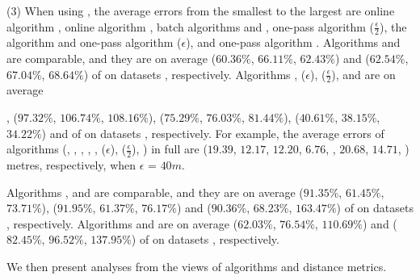 \sstab (3) When using \sed, the average errors from the smallest
to the largest are online algorithm {\dagots}, online algorithm \squishe, batch algorithms \tpa and \dpa,
one-pass algorithm \cised($\frac{\epsilon}{2}$),  the \opt algorithm and one-pass algorithm \cised(${\epsilon}$), and one-pass algorithm .
%
Algorithms \tpa and \dpa are comparable, and they are on average
{($60.36\%$, $66.11\%$, $62.43\%$) and ($62.54\%$, $67.04\%$, $68.64\%$)} of \opt on datasets \dSets, respectively.
Algorithms , \cised(${\epsilon}$), \cised($\frac{\epsilon}{2}$), \squishe and {\dagots} are on average {, ($97.32\%$, $106.74\%$, $108.16\%$), ($75.29\%$, $76.03\%$, $81.44\%$), ($40.61\%$, $38.15\%$, $34.22\%$) and  of \opt on datasets \dSets, respectively.
%
For example, the average errors of algorithms
(\opt, \tpa, \dpa, \squishe, {\dagots}, \cised(${\epsilon}$), \cised($\frac{\epsilon}{2}$),  ) in full \mopsi are ($19.39$, $12.17$, $12.20$,  $6.76$, , $20.68$, $14.71$,  ) metres, respectively, when $\epsilon$ = $40m$.
%


Algorithms \tpa, \opwa and \interval are comparable, and they are on average
{($91.35\%$, $61.45\%$, $73.71\%$), ($91.95\%$, $61.37\%$, $76.17\%$) and ($90.36\%$, $68.23\%$, $163.47\%$)} of \opt on datasets \dSets, respectively.
Algorithms \intersec and \dpa are on average ($62.03\%$, $76.54\%$, $110.69\%$) and ($82.45\%$, $96.52\%$, $137.95\%$) of \opt on datasets \dSets, respectively.




We then present analyses from the views of \lsa algorithms and distance metrics.


}
